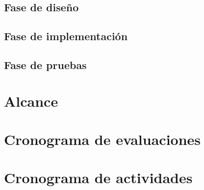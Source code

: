 \subsection{Fase de diseño}

\subsection{Fase de implementación}

\subsection{Fase de pruebas}

\section{Alcance}

\section{Cronograma de evaluaciones}


\pagebreak

\section{Cronograma de actividades}

\pagebreak